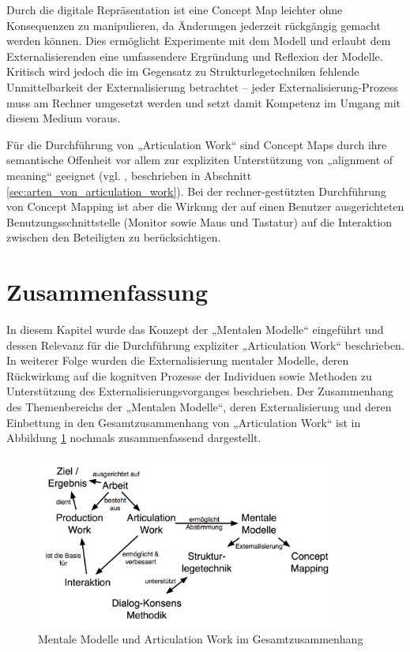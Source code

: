 Durch die digitale Repräsentation ist eine Concept Map leichter ohne Konsequenzen zu manipulieren, da Änderungen jederzeit rückgängig gemacht werden können. Dies ermöglicht Experimente mit dem Modell und erlaubt dem Externalisierenden eine umfassendere Ergründung und Reflexion der Modelle. Kritisch wird jedoch die im Gegensatz zu Strukturlegetechniken fehlende Unmittelbarkeit der Externalisierung betrachtet – jeder Externalisierung-Prozess muss am Rechner umgesetzt werden und setzt damit Kompetenz im Umgang mit diesem Medium voraus. \citet[][S. 30f]{Ifenthaler06}

Für die Durchführung von „Articulation Work“ sind Concept Maps durch ihre semantische Offenheit vor allem zur expliziten Unterstützung von „alignment of meaning“ geeignet (vgl. \citep{Sarini02}, beschrieben in Abschnitt \ref{sec:arten_von_articulation_work}). Bei der rechner-gestützten Durchführung von Concept Mapping ist aber die Wirkung der auf einen Benutzer ausgerichteten Benutzungsschnittstelle (Monitor sowie Maus und Tastatur) auf die Interaktion zwischen den Beteiligten zu berücksichtigen.



\section{Zusammenfassung} %
\label{sec:mentale_modelle_fazit}

In diesem Kapitel wurde das Konzept der „Mentalen Modelle“ eingeführt und dessen Relevanz für die Durchführung expliziter „Articulation Work“ beschrieben. In weiterer Folge wurden die Externalisierung mentaler Modelle, deren Rückwirkung auf die kognitven Prozesse der Individuen sowie Methoden zu Unterstützung des Externalisierungsvorganges beschrieben. Der Zusammenhang des Themenbereichs der „Mentalen Modelle“, deren Externalisierung und deren Einbettung in den Gesamtzusammenhang von „Articulation Work“ ist in Abbildung \ref{fig:img_MentaleModelle_ArbeitInteraktionMentaleModelle} nochmals zusammenfassend dargestellt.

\begin{figure}[htbp]
	\centering
		\includegraphics[width=10cm]{img/MentaleModelle/ArbeitInteraktionMentaleModelle.png}
	\caption{Mentale Modelle und Articulation Work im Gesamtzusammenhang}
	\label{fig:img_MentaleModelle_ArbeitInteraktionMentaleModelle}
\end{figure}


